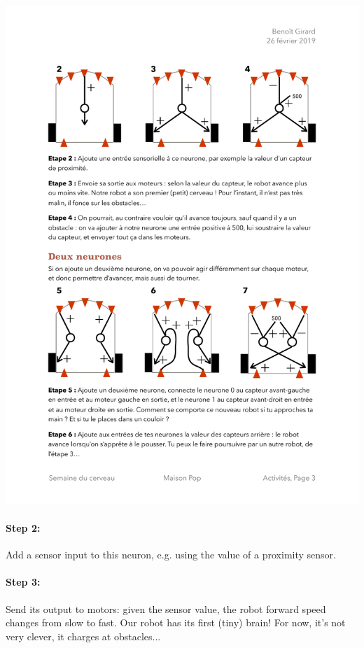 \documentclass[12pt]{article}
\begin{document}
~\\
\begin{center}
\includegraphics[width=\textwidth]{../Etapes2-4.pdf}
\end{center}

\paragraph{Step 2:} Add a sensor input to this neuron, e.g. using the value of a proximity sensor.

\paragraph{Step 3:} Send its output to motors: given the sensor value, the robot forward speed changes from slow to fast. Our robot has its first (tiny) brain! For now, it's not very clever, it charges at obstacles...
\end{document}
